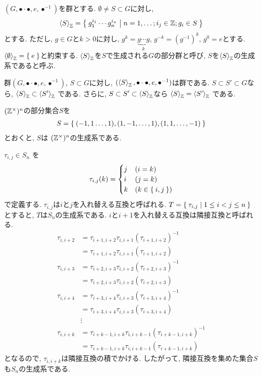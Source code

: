 \begin{definition}
  $(G,\bullet\cdot\bullet,e,\bullet^{-1})$を群とする.
  $\emptyset \neq S\subset G$に対し,
  \begin{align*}
    \Braket{S}_{\mathbb{Z}}=\Set{g_1^{i_1}\cdots g_n^{i_n}|n=1,\ldots;i_j\in \mathbb{Z};g_i\in S}
  \end{align*}
  とする.
  ただし,
  $g\in G$と$k>0$に対し, $g^{k}=\underbrace{g\cdots g}_{k}$,
  $g^{-k}=(g^{-1})^{k}$, $g^0=e$とする.
  $\Braket{\emptyset}_{\mathbb{Z}}=\Set{e}$と約束する.
  $\Braket{S}_{\mathbb{Z}}$を$S$で生成される$G$の部分群と呼び,
  $S$を$\Braket{S}_{\mathbb{Z}}$の生成系であると呼ぶ.
\end{definition}
群$(G,\bullet\cdot\bullet,e,\bullet^{-1})$,
$S\subset G$に対し,
$(\Braket{S}_{\mathbb{Z}},\bullet\cdot\bullet,e,\bullet^{-1})$は群である.
$S\subset S' \subset G$なら,
$\Braket{S}_{\mathbb{Z}}\subset\Braket{S'}_{\mathbb{Z}}$
である.
さらに,
$S\subset S' \subset \Braket{S}_{\mathbb{Z}}$なら
$\Braket{S}_{\mathbb{Z}}=\Braket{S'}_{\mathbb{Z}}$
である.

\begin{example}
$(\mathbb{Z}^\times)^n$の部分集合$S$を
\begin{align*}
  S=\Set{(-1,1\ldots,1),(1,-1,\ldots,1),(1,1,\ldots,-1)}
\end{align*}
とおくと, $S$は
$(\mathbb{Z}^\times)^n$の生成系である.
\end{example}

\begin{example}
$\tau_{i,j}\in S_n$
を
\begin{align*}
  \tau_{i,j}(k)=
  \begin{cases}
    j&(i=k)\\
    i&(j=k)\\
    k&(k\in\Set{i,j})
  \end{cases}
\end{align*}
で定義する.
$\tau_{i,j}$は$i$と$j$を入れ替える互換と呼ばれる.
$T=\Set{\tau_{i,j}|1\leq i<j\leq n}$とすると,
$T$は$S_n$の生成系である.
$i$と$i+1$を入れ替える互換は隣接互換と呼ばれる.
\begin{align*}
  \tau_{i,i+2}
  &=\tau_{i+1,i+2}\tau_{i,i+1}(\tau_{i+1,i+2})^{-1}\\
  &=\tau_{i+1,i+2}\tau_{i,i+1}(\tau_{i+1,i+2})\\
  \tau_{i,i+3}
  &=\tau_{i+2,i+3}\tau_{i,i+2}(\tau_{i+2,i+3})^{-1}\\
  &=\tau_{i+2,i+3}\tau_{i,i+2}(\tau_{i+2,i+3})\\
  \tau_{i,i+4}
  &=\tau_{i+3,i+4}\tau_{i,i+3}(\tau_{i+3,i+4})^{-1}\\
  &=\tau_{i+3,i+4}\tau_{i,i+3}(\tau_{i+3,i+4})\\
  &\vdots\\
  \tau_{i,i+k}
  &=\tau_{i+k-1,i+k}\tau_{i,i+k-1}(\tau_{i+k-1,i+k})^{-1}\\
  &=\tau_{i+k-1,i+k}\tau_{i,i+k-1}(\tau_{i+k-1,i+k})
\end{align*}
となるので,
$\tau_{i,i+k}$は隣接互換の積でかける.
したがって,
隣接互換を集めた集合$S$も$S_n$の生成系である.
\end{example}



